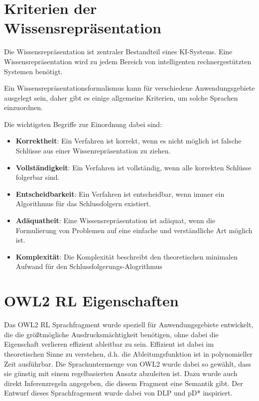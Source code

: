 \section{Kriterien der Wissensrepräsentation}

Die Wissensrepräsentation ist zentraler Bestandteil eines KI-Systems. Eine Wissensrepräsentation wird zu jedem Bereich von intelligenten rechnergestützten Systemen benötigt.

Ein Wissensrepräsentationsformalismus kann für verschiedene Anwendungsgebiete ausgelegt sein, daher gibt es einige allgemeine Kriterien, um solche Sprachen einzuordnen.

Die wichtigsten Begriffe zur Einordnung dabei sind:
\begin{itemize}
  \item \textbf{Korrektheit}:
Ein Verfahren ist korrekt, wenn es nicht möglich ist falsche Schlüsse aus einer Wissenrepräsentation zu ziehen.
 \item \textbf{Vollständigkeit}:
Ein Verfahren ist vollständig, wenn alle korrekten Schlüsse folgerbar sind.
 \item \textbf{Entscheidbarkeit}:
Ein Verfahren ist entscheidbar, wenn immer ein Algorithmus für das Schlussfolgern existiert.
 \item \textbf{Adäquatheit}:
Eine Wissensrepräsentation ist adäquat, wenn die Formulierung von Problemen auf eine einfache und verständliche Art möglich ist.
 \item \textbf{Komplexität}:
Die Komplexität beschreibt den theoretischen minimalen Aufwand für den Schlussfolgerungs-Alogrithmus
\end{itemize}

\section{OWL2 RL Eigenschaften}
Das OWL2 RL Sprachfragment wurde speziell für Anwendungsgebiete entwickelt, die die größtmögliche Ausdrucksmächtigkeit benötigen, ohne dabei die Eigenschaft verlieren effizient ableitbar zu sein. Effizient ist dabei im theoretischen Sinne zu verstehen, d.h. die Ableitungsfunktion ist in polynomieller Zeit ausführbar. Die Sprachuntermenge von OWL2 wurde dabei so gewählt, dass sie günstig mit einem regelbasierten Ansatz abzuleiten ist. Dazu wurde auch direkt Inferenzregeln angegeben, die diesem Fragment eine Semantik gibt. Der Entwurf dieses Sprachfragement wurde dabei von DLP \cite{Grosof2003} und pD* \cite{Li2006} inspiriert.

